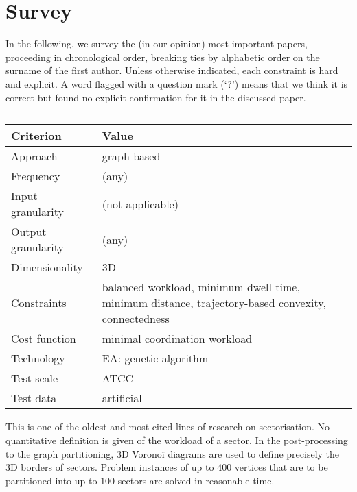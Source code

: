\documentclass[a4paper,12pt]{article}
\begin{document}
\section{Survey}
\label{sect:survey}

In the following, we survey the (in our opinion) most important
papers, proceeding in chronological order, breaking ties by alphabetic
order on the surname of the first author.  Unless otherwise indicated,
each constraint is hard and explicit.  A word flagged with a question
mark (`?') means that we think it is correct but found no explicit
confirmation for it in the discussed paper.

\subsection{\cite{Delahaye:ICEC98}}

\begin{center}
\begin{tabular}{|l|l|}
  \hline
  Criterion & Value \\
  \hline\hline
  Approach & graph-based \\ \hline
  Frequency & (any) \\ \hline
  Input granularity & (not applicable) \\ \hline
  Output granularity & (any) \\ \hline
  Dimensionality & 3D \\ \hline
  Constraints & \parbox{11.5cm}{balanced workload, minimum
    dwell time, minimum distance, trajectory-based convexity,
    connectedness} \\ \hline
  Cost function & minimal coordination workload \\ \hline
  Technology & EA: genetic algorithm \\ \hline
  Test scale & ATCC \\ \hline
  Test data & artificial \\ \hline
\end{tabular}
\end{center}
This is one of the oldest and most cited lines of research on
sectorisation.  No quantitative definition is given of the workload of
a sector.  In the post-processing to the graph partitioning, 3D
Vorono\"i diagrams are used to define precisely the 3D borders of
sectors.  Problem instances of up to $400$ vertices that are to be
partitioned into up to $100$ sectors are solved in reasonable time.

\subsection{\cite{Yousefi:ATIO04}}
\end{document}
